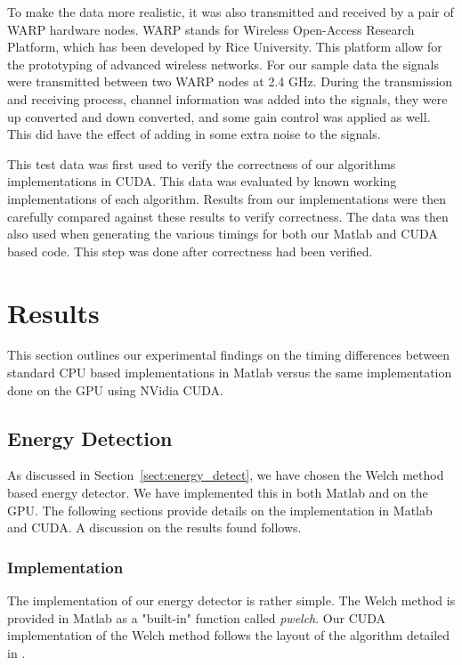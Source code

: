 To make the data more realistic, it was also transmitted and received by a pair of WARP hardware nodes.  WARP stands for Wireless Open-Access Research Platform, which has been developed by Rice University.  This platform allow for the prototyping of advanced wireless networks.  For our sample data the signals were transmitted between two WARP nodes at 2.4 GHz.  During the transmission and receiving process, channel information was added into the signals, they were up converted and down converted, and some gain control was applied as well.  This did have the effect of adding in some extra noise to the signals.

This test data was first used to verify the correctness of our algorithms implementations in CUDA.  This data was evaluated by known working implementations of each algorithm.  Results from our implementations were then carefully compared against these results to verify correctness.  The data was then also used when generating the various timings for both our Matlab and CUDA based code.  This step was done after correctness had been verified.

\section{Results}
\label{sect:gpu_results}
This section outlines our experimental findings on the timing differences between standard CPU based implementations in Matlab versus the same implementation done on the GPU using NVidia CUDA.

\subsection{Energy Detection}
\label{sect:energy_detect_result}
As discussed in Section~\ref{sect:energy_detect}, we have chosen the Welch method based energy detector.  We have implemented this in both Matlab and on the GPU.  The following sections provide details on the implementation in Matlab and CUDA.  A discussion on the results found follows.

\subsubsection{Implementation}
The implementation of our energy detector is rather simple.  The Welch method is provided in Matlab as a "built-in" function called \textit{pwelch}.  Our CUDA implementation of the Welch method follows the layout of the algorithm detailed in \cite{Welch67}.  

